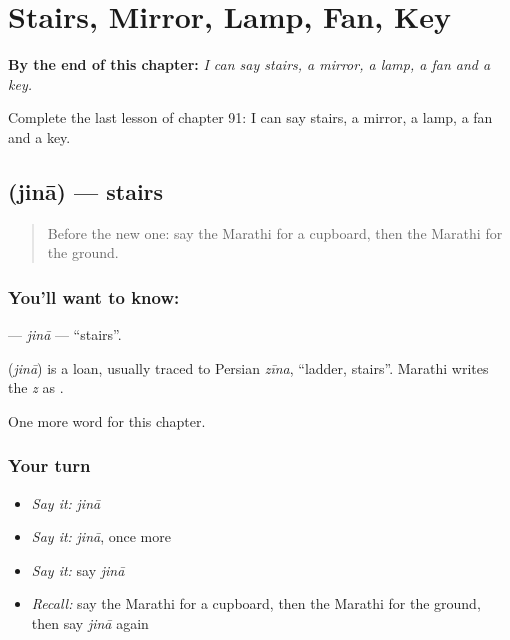 
\chapter{Stairs, Mirror, Lamp, Fan, Key}
\label{ch:mr-stairs-mirror-lamp-fan-key}

\begin{chapteropening}
\textbf{By the end of this chapter:} \emph{I can say stairs, a mirror, a lamp, a fan and a key.}

Complete the last lesson of chapter 91: I can say stairs, a mirror, a lamp, a fan and a key.
\end{chapteropening}

\section[\texorpdfstring{\mr{जिना} (jinā)}{जिना (jinā)}]{ (jinā) — stairs}

\label{lesson:MR-C91-jina}



\begin{quote}
Before the new one: say the Marathi for a cupboard, then the Marathi for the ground.
\end{quote}

\subsection*{You'll want to know: }
\textbf{} — \emph{jinā} — \textquotedblleft{}stairs\textquotedblright{}.

\begin{cousinweb}
\textbf{} (\emph{jinā}) is a loan, usually traced to Persian \emph{zīna}, \textquotedblleft{}ladder, stairs\textquotedblright{}. Marathi writes the \emph{z} as \textbf{}.
\end{cousinweb}

\begin{grammarlens}[title={What you've built}]
One more word for this chapter.
\end{grammarlens}

\subsection*{Your turn}
\begin{itemize}
\raggedright
  \item \emph{Say it:} \emph{jinā}
  \item \emph{Say it:} \emph{jinā}, once more
  \item \emph{Say it:} say \emph{jinā}
  \item \emph{Recall:} say the Marathi for a cupboard, then the Marathi for the ground, then say \emph{jinā} again
\end{itemize}

